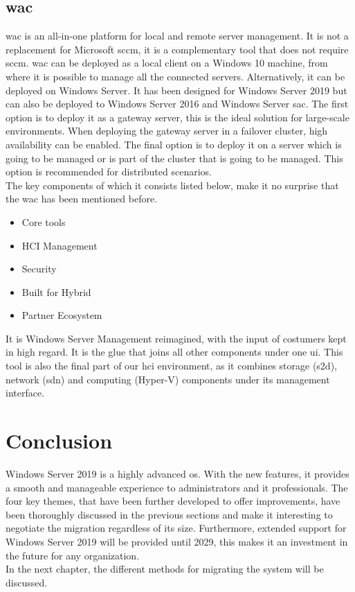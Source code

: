 \subsection{\acrfull{wac}}
\acrlong{wac} is an all-in-one platform for local and remote server management.
It is not a replacement for Microsoft \acrfull{sccm}, it is a complementary tool that does not require \acrshort{sccm}.	
\acrshort{wac} can be deployed as a local client on a Windows 10 machine, from where it is possible to manage all the connected servers. 
Alternatively, it can be deployed on Windows Server. 
It has been designed for Windows Server 2019 but can also be deployed to Windows Server 2016 and Windows Server \acrshort{sac}.
The first option is to deploy it as a gateway server, this is the ideal solution for large-scale environments.
When deploying the gateway server in a failover cluster, high availability can be enabled. 
The final option is to deploy it on a server which is going to be managed or is part of the cluster that is going to be managed. 
This option is recommended for distributed scenarios.\\
The key components of which it consists listed below, make it no surprise that the \acrlong{wac} has been mentioned before. 
\begin{itemize}
	\item Core tools
	\item HCI Management
	\item Security
	\item Built for Hybrid
	\item Partner Ecosystem
\end{itemize}
It is Windows Server Management reimagined, with the input of costumers kept in high regard. 
It is the glue that joins all other components under one \acrfull{ui}. 
This tool is also the final part of our \acrshort{hci} environment, as it combines storage (\acrshort{s2d}), network (\acrshort{sdn}) and computing (Hyper-V) components under its management interface. 

\section{Conclusion}

Windows Server 2019 is a highly advanced \acrshort{os}. 
With the new features, it provides a smooth and manageable experience to administrators and \acrshort{it} professionals.
The four key themes, that have been further developed to offer improvements, have been thoroughly discussed in the previous sections and make it interesting to negotiate the migration regardless of its size.
Furthermore, extended support for Windows Server 2019 will be provided until 2029, this makes it an investment in the future for any organization.\\
In the next chapter, the different methods for migrating the system will be discussed.
